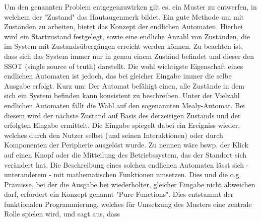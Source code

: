 Um den genannten Problem entgegenzuwirken gilt es, ein Muster zu entwerfen,
in welchem der "Zustand" das Hautaugenmerk bildet.
Ein gute Methode um mit Zuständen zu arbeiten, bietet das Konzept der endlichen Automaten.
Hierbei wird ein Startzustand festgelegt, sowie eine endliche Anzahl von Zuständen, die im System mit
Zustandsübergängen erreicht werden können. Zu beachten ist, dass sich das System immer nur in genau
einem Zuständ befindet und dieser den SSOT (single source of truth) darstellt.
Die wohl wichtigste Eigenschaft eines endlichen Automaten ist jedoch, das bei gleicher Eingabe
immer die selbe Ausgabe erfolgt.
Kurz um: Der Automat befähigt einen, alle Zustände in dem sich ein System befinden kann
konsistent zu beschreiben. 
Unter der Vielzahl endlichen Automaten fällt die Wahl auf den sogenannten Mealy-Automat.
Bei diesem wird der nächste Zustand auf Basis des derzeitigen Zustands und der erfolgten Eingabe ermittelt.
Die Eingabe spiegelt dabei ein Ereigniss wieder, welches durch den Nutzer selbst (und seinen Interaktionen) 
oder durch Komponenten der Peripherie ausgelöst wurde. Zu nennen wäre bswp. 
der Klick auf einen Knopf oder die Mitteilung des Betriebssystem, das der Standort sich verändert hat.
Die Beschreibung eines solchen endlichen Automaten lässt sich - unteranderem - mit
mathematischen Funktionen umsetzen. Dies und die o.g. Prämisse, bei der die Ausgabe bei wiederholter,
gleicher Eingabe nicht abweichen darf, erfordert ein Konzept genannt "Pure Functions".
Dies entstammt der funktionalen Programmierung, welches für Umsetzung des Musters eine zentrale Rolle spielen wird,
und sagt aus, dass 